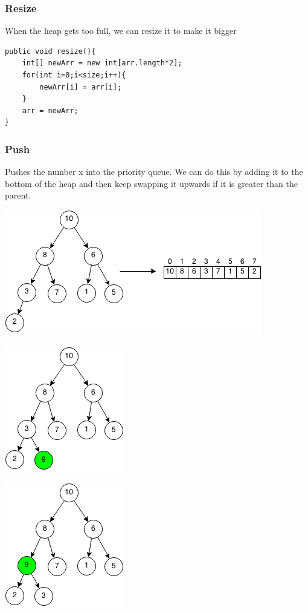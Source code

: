 \documentclass[11pt,oneside]{book}
\makeatletter
\def\maxwidth#1{\ifdim\Gin@nat@width>#1 #1\else\Gin@nat@width\fi}
\makeatother
\begin{document}
\subsubsection{Resize}

When the heap gets too full, we can resize it to make it bigger

\begin{lstlisting}
public void resize(){
    int[] newArr = new int[arr.length*2];
    for(int i=0;i<size;i++){
        newArr[i] = arr[i];
    }
    arr = newArr;
}
\end{lstlisting}

\subsubsection{Push}

Pushes the number x into the priority queue. We can do this by adding it to the bottom of the heap and then keep swapping it upwards if it is greater than the parent.

\includegraphics[width=\maxwidth{\textwidth}]{maxheap.png}

\includegraphics[width=\maxwidth{\textwidth}]{maxheappush.png}

\includegraphics[width=\maxwidth{\textwidth}]{maxheappush2.png}
\end{document}
